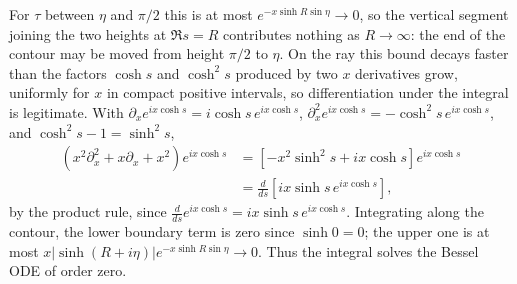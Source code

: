 For $\tau$ between $\eta$ and $\pi/2$ this is at most
$e^{-x\sinh R\sin\eta}\to0$, so the vertical segment joining the
two heights at $\Re s=R$ contributes nothing as $R\to\infty$: the
end of the contour may be moved from height $\pi/2$ to $\eta$. On
the ray this bound decays faster than the factors $\cosh s$ and
$\cosh^2s$ produced by two $x$ derivatives grow, uniformly for $x$
in compact positive intervals, so differentiation under the
integral is legitimate. With
$\partial_xe^{ix\cosh s}=i\cosh s\,e^{ix\cosh s}$,
$\partial_x^2e^{ix\cosh s}=-\cosh^2s\,e^{ix\cosh s}$, and
$\cosh^2s-1=\sinh^2s$,
\begin{align*}
(x^2\partial_x^2+x\partial_x+x^2)e^{ix\cosh s}
&=[-x^2\sinh^2s+ix\cosh s]e^{ix\cosh s}\\
&=\frac d{ds}[ix\sinh s\,e^{ix\cosh s}],
\end{align*}
by the product rule, since $\frac d{ds}e^{ix\cosh s}
=ix\sinh s\,e^{ix\cosh s}$. Integrating along the contour, the
lower boundary term is zero since $\sinh0=0$; the upper one is at
most $x|\sinh(R+i\eta)|e^{-x\sinh R\sin\eta}\to0$. Thus the
integral solves the Bessel ODE of order zero.


